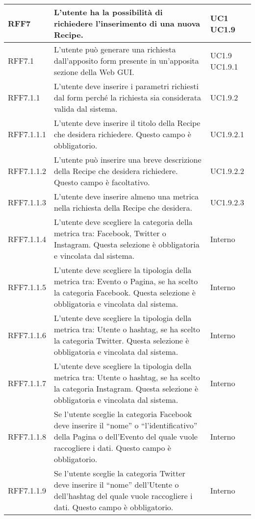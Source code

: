 \begin{center}
\begin{longtable}{| p{2.5cm} | p{8cm} | p{2cm} |}

		RFF7  & L'utente ha la possibilità di richiedere l'inserimento di una nuova Recipe. & UC1 \newline UC1.9 \\
		\hline
		RFF7.1  & L'utente può generare una richiesta dall'apposito form presente in un'apposita sezione della Web GUI. & UC1.9 \newline UC1.9.1 \\
		\hline
		RFF7.1.1 & L'utente deve inserire i parametri richiesti dal form perché la richiesta sia considerata valida dal sistema. & UC1.9.2  \\
		\hline
		RFF7.1.1.1 & L'utente deve inserire il titolo della Recipe che desidera richiedere. Questo campo è obbligatorio. & UC1.9.2.1 \\
		\hline
		RFF7.1.1.2 & L'utente può inserire una breve descrizione della Recipe che desidera richiedere. Questo campo è facoltativo. & UC1.9.2.2 \\
		\hline
		RFF7.1.1.3 & L'utente deve inserire almeno una metrica nella richiesta della Recipe che desidera. & UC1.9.2.3 \\
		\hline
		RFF7.1.1.4 & L'utente deve scegliere la categoria della metrica tra: Facebook, Twitter o Instagram. Questa selezione è obbligatoria e vincolata dal sistema. & Interno \\
		\hline
		RFF7.1.1.5 & L'utente deve scegliere la tipologia della metrica tra: Evento o Pagina, se ha scelto la categoria Facebook. Questa selezione è obbligatoria e vincolata dal sistema. & Interno \\
		\hline
		RFF7.1.1.6 & L'utente deve scegliere la tipologia della metrica tra: Utente o hashtag, se ha scelto la categoria Twitter. Questa selezione è obbligatoria e vincolata dal sistema. & Interno \\
		\hline
		RFF7.1.1.7 & L'utente deve scegliere la tipologia della metrica tra: Utente o hashtag, se ha scelto la categoria Instagram. Questa selezione è obbligatoria e vincolata dal sistema. & Interno \\
		\hline
		RFF7.1.1.8 & Se l'utente sceglie la categoria Facebook deve inserire il ``nome'' o ``l'identificativo'' della Pagina o dell'Evento del quale vuole raccogliere i dati. Questo campo è obbligatorio. & Interno \\
		\hline
		RFF7.1.1.9 & Se l'utente sceglie la categoria Twitter deve inserire il ``nome'' dell'Utente o dell'hashtag del quale vuole raccogliere i dati. Questo campo è obbligatorio. & Interno \\

\end{longtable}
\end{center}
